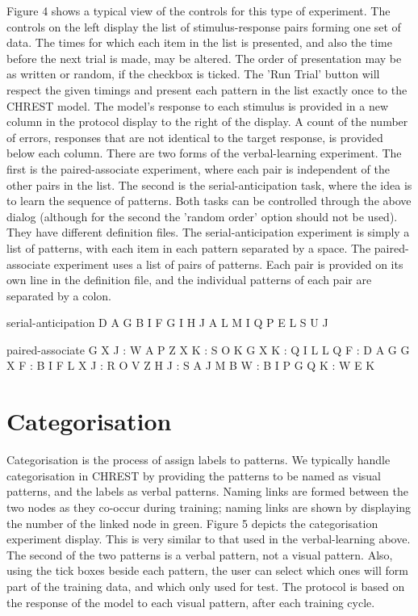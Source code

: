 \documentclass{article}
\begin{document}
Figure 4 shows a typical view of the controls for this type of experiment.  The controls on the left display the list of stimulus-response pairs forming one set of data.  The times for which each item in the list is presented, and also the time before the next trial is made, may be altered.  The order of presentation may be as written or random, if the checkbox is ticked.  The  'Run Trial' button will respect the given timings and present each pattern in the list exactly once to the CHREST model.  The model's response to each stimulus is provided in a new column in the protocol display to the right of the display.  A count of the number of errors, responses that are not identical to the target response, is provided below each column.
There are two forms of the verbal-learning experiment.  The first is the paired-associate experiment, where each pair is independent of the other pairs in the list.  The second is the serial-anticipation task, where the idea is to learn the sequence of patterns.  Both tasks can be controlled through the above dialog (although for the second the 'random order' option should not be used).  They have different definition files.
The serial-anticipation experiment is simply a list of patterns, with each item in each pattern separated by a space.  The paired-associate experiment uses a list of pairs of patterns.  Each pair is provided on its own line in the definition file, and the individual patterns of each pair are separated by a colon.

serial-anticipation 
D A G 
B I F 
G I H 
J A L 
M I Q 
P E L 
S U J


paired-associate 
G X J : W A P 
Z X K : S O K 
G X K : Q I L 
L Q F : D A G 
G X F : B I F 
L X J : R O V 
Z H J : S A J 
M B W : B I P 
G Q K : W E K

\section{Categorisation}

Categorisation is the process of assign labels to patterns.  We typically handle categorisation in CHREST by providing the patterns to be named as visual patterns, and the labels as verbal patterns.  Naming links are formed between the two nodes as they co-occur during training; naming links are shown by displaying the number of the linked node in green.
Figure 5 depicts the categorisation experiment display.  This is very similar to that used in the verbal-learning above.  The second of the two patterns is a verbal pattern, not a visual pattern.  Also, using the tick boxes beside each pattern, the user can select which ones will form part of the training data, and which only used for test.  The protocol is based on the response of the model to each visual pattern, after each training cycle.
\end{document}

